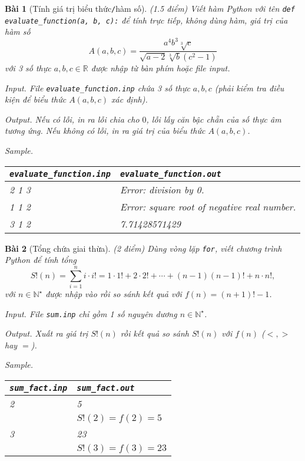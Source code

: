 \documentclass{article}
\newtheorem{baitoan}{Bài}
\begin{document}
\begin{baitoan}[Tính giá trị biểu thức{\tt/}hàm số]
	{\rm(1.5 điểm)} Viết hàm Python với tên \verb|def evaluate_function(a, b, c):| để tính trực tiếp, không dùng hàm, giá trị của hàm số
	\begin{equation*}
		A(a,b,c) = \frac{a^4b^3\sqrt[3]{c}}{\sqrt{a - 2}\sqrt[3]{b}(c^2 - 1)}
	\end{equation*}
	với 3 số thực $a,b,c\in\mathbb{R}$ được nhập từ bàn phím hoặc file input.
	\item {\sf Input.} File \verb|evaluate_function.inp| chứa 3 số thực $a,b,c$ (phải kiểm tra điều kiện để biểu thức $A(a,b,c)$ xác định).
	\item {\sf Output.} Nếu có lỗi, in ra lỗi chia cho $0$, lỗi lấy căn bậc chẵn của số thực âm tương ứng. Nếu không có lỗi, in ra giá trị của biểu thức $A(a,b,c)$.
	\item {\sf Sample.}
	\begin{table}[H]
		\centering
		\begin{tabular}{|l|l|}
			\hline
			\verb|evaluate_function.inp| & \verb|evaluate_function.out| \\
			\hline
			2 1 3 & Error: division by 0. \\
			1 1 2 & Error: square root of negative real number. \\
			3 1 2 & 7.71428571429 \\
			\hline
		\end{tabular}
	\end{table}
\end{baitoan}

\begin{baitoan}[Tổng chứa giai thừa]
	{\rm(2 điểm)} Dùng vòng lặp {\tt for}, viết chương trình Python để tính tổng
	\begin{equation*}
		S!(n) = \sum_{i=1}^n i\cdot i! = 1\cdot1! + 2\cdot2! + \cdots + (n - 1)(n - 1)! + n\cdot n!,
	\end{equation*}
	với $n\in\mathbb{N}^\star$ được nhập vào rồi so sánh kết quả với $f(n) = (n + 1)! - 1$.
	\item {\sf Input.} File {\tt sum.inp} chỉ gồm 1 số nguyên dương $n\in\mathbb{N}^\star$.
	\item {\sf Output.} Xuất ra giá trị $S!(n)$ rồi kết quả so sánh $S!(n)$ với $f(n)$ ($<,>$ hay $=$).
	\item {\sf Sample.}
	\begin{table}[H]
		\centering
		\begin{tabular}{|l|l|}
			\hline
			\verb|sum_fact.inp| & \verb|sum_fact.out| \\
			\hline
			2 & 5 \\
			& $S!(2) = f(2) = 5$ \\
			\hline
			3 & 23 \\
			& $S!(3) = f(3) = 23$ \\
			\hline
		\end{tabular}
	\end{table}
\end{baitoan}
\end{document}
